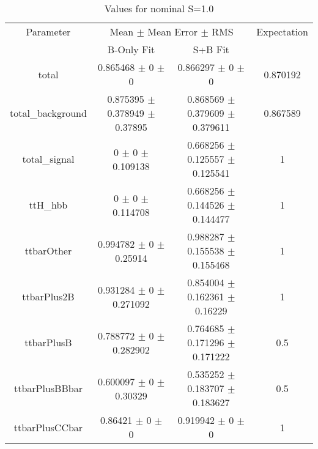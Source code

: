 \begin{table}
\centering
\caption{Values for nominal S=1.0}
\begin{tabular}{cccc}
\toprule
Parameter & \multicolumn{2}{c}{Mean $\pm$ Mean Error $\pm$ RMS} & Expectation\\
 & B-Only Fit & S+B Fit & \\
\midrule
total & \num{0.865468} $\pm$ \num{0} $\pm$ \num{0} & \num{0.866297} $\pm$ \num{0} $\pm$ \num{0} & \num{0.870192}\\
total\_background & \num{0.875395} $\pm$ \num{0.378949} $\pm$ \num{0.37895} & \num{0.868569} $\pm$ \num{0.379609} $\pm$ \num{0.379611} & \num{0.867589}\\
total\_signal & \num{0} $\pm$ \num{0} $\pm$ \num{0.109138} & \num{0.668256} $\pm$ \num{0.125557} $\pm$ \num{0.125541} & \num{1}\\
ttH\_hbb & \num{0} $\pm$ \num{0} $\pm$ \num{0.114708} & \num{0.668256} $\pm$ \num{0.144526} $\pm$ \num{0.144477} & \num{1}\\
ttbarOther & \num{0.994782} $\pm$ \num{0} $\pm$ \num{0.25914} & \num{0.988287} $\pm$ \num{0.155538} $\pm$ \num{0.155468} & \num{1}\\
ttbarPlus2B & \num{0.931284} $\pm$ \num{0} $\pm$ \num{0.271092} & \num{0.854004} $\pm$ \num{0.162361} $\pm$ \num{0.16229} & \num{1}\\
ttbarPlusB & \num{0.788772} $\pm$ \num{0} $\pm$ \num{0.282902} & \num{0.764685} $\pm$ \num{0.171296} $\pm$ \num{0.171222} & \num{0.5}\\
ttbarPlusBBbar & \num{0.600097} $\pm$ \num{0} $\pm$ \num{0.30329} & \num{0.535252} $\pm$ \num{0.183707} $\pm$ \num{0.183627} & \num{0.5}\\
ttbarPlusCCbar & \num{0.86421} $\pm$ \num{0} $\pm$ \num{0} & \num{0.919942} $\pm$ \num{0} $\pm$ \num{0} & \num{1}\\
\bottomrule
\end{tabular}
\end{table}